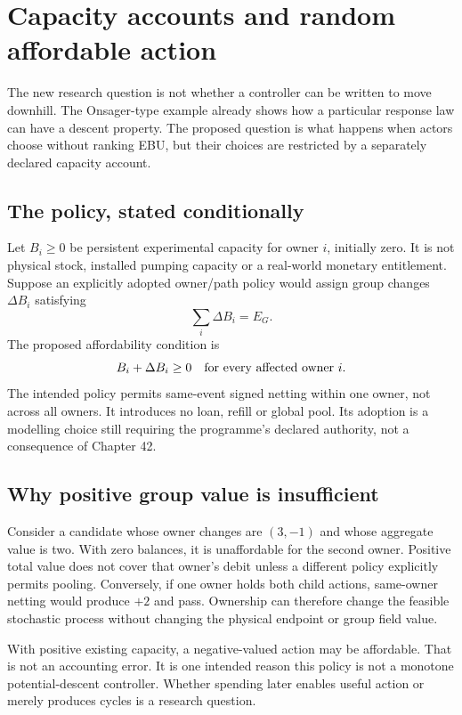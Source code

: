 \chapter{Capacity accounts and random affordable action}\label{ch:capacity}
The new research question is not whether a controller can be written to
move downhill. The Onsager-type example already shows how a particular
response law can have a descent property. The proposed question is what
happens when actors choose without ranking EBU, but their choices are
restricted by a separately declared capacity account.

\section{The policy, stated conditionally}
Let $B_i\geq0$ be persistent experimental capacity for owner $i$, initially
zero. It is not physical stock, installed pumping capacity or a real-world
monetary entitlement. Suppose an explicitly adopted owner/path policy would
assign group changes $\Delta B_i$ satisfying
\begin{equation}
 \sum_i\Delta B_i=E_G.
\end{equation}
The proposed affordability condition is
\begin{equation}
 B_i+\Delta B_i\geq0\quad\hbox{for every affected owner }i.
\end{equation}
The intended policy permits same-event signed netting within one owner,
not across all owners. It introduces no loan, refill or global pool.
Its adoption is a modelling choice still requiring the programme's declared
authority, not a consequence of Chapter 42.

\section{Why positive group value is insufficient}
Consider a candidate whose owner changes are $(3,-1)$ and whose aggregate
value is two. With zero balances, it is unaffordable for the second owner.
Positive total value does not cover that owner's debit unless a different
policy explicitly permits pooling. Conversely, if one owner holds both
child actions, same-owner netting would produce $+2$ and pass. Ownership
can therefore change the feasible stochastic process without changing the
physical endpoint or group field value.

With positive existing capacity, a negative-valued action may be affordable.
That is not an accounting error. It is one intended reason this policy is
not a monotone potential-descent controller. Whether spending later enables
useful action or merely produces cycles is a research question.

